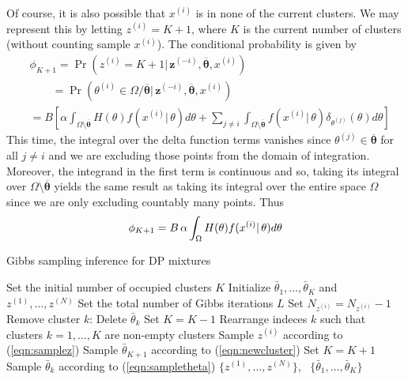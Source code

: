 \documentclass[final,3p,times,twocolumn]{elsarticle}
\DeclareMathOperator*{\Cat}{Cat}
\let\bs\boldsymbol
\begin{document}
Of course, it is also possible that $x^{(i)}$ is in none of the current clusters.
We may represent this by letting $z^{(i)} = K+1$, where $K$ is the current number of clusters (without counting sample $x^{(i)}$).
The conditional probability is given by 
\begin{equation*}
\begin{split}
&\phi_{K+1} = \Pr(z^{(i)}=K+1|\,\bs z^{(-i)},\overline {\bs \theta},x^{(i)})\\
&\quad\quad= \Pr(\theta^{(i)} \in \Omega/\bs{\overline \theta}|\,\bs z^{(-i)},\overline {\bs \theta},x^{(i)})\\
&= B\left[\alpha\int_{\Omega\setminus\overline{\bs\theta}} H(\theta)f(x^{(i)}|\,\theta)d\theta + \sum_{j\neq i}\int_{\Omega\setminus\overline{\bs\theta}}f(x^{(i)}|\,\theta)\delta_{\theta^{(j)}}(\theta)d\theta\right]
\end{split}
\end{equation*}
This time, the integral over the delta function terms vanishes since $\theta^{(j)}\in \overline{\bs\theta}$ for all $j\neq i$ and we are excluding those points from the domain of integration.
Moreover, the integrand in the first term is continuous and so, taking its integral over $\Omega\setminus\overline{\bs\theta}$ yields the same result as taking its integral over the entire space $\Omega$ since we are only excluding countably many points.
Thus
\begin{equation}
\label{eqn:phi_K+1}
\phi_{K+1} = B\, \alpha \int_\Omega H(\theta)f(x^{(i)}|\,\theta)d\theta\\
\end{equation}

\begin{algorithm}
\caption{Gibbs sampling inference for DP mixtures}
\begin{algorithmic}[1]
\State Set the initial number of occupied clusters $K$
\State Initialize $\bar \theta_1,\dots, \bar \theta_K$ and $z^{(1)},\dots,z^{(N)}$
\State Set the total number of Gibbs iterations $L$
\State Set $N_{z^{(i)}}=N_{z^{(i)}}-1$
\State Remove cluster $k$: Delete $\bar \theta_k$
\State Set $K = K - 1$
\State Rearrange indeces $k$ such that clusters 
\State \quad $k=1,\dots,K$ are non-empty clusters
\EndIf
\State Sample $z^{(i)}$ according to (\ref{eqn:samplez})%
\State Sample $\bar \theta_{K+1}$ according to (\ref{eqn:newcluster})
\State Set $K=K+1$
\EndIf
\EndFor
{}
\State Sample $\bar \theta_k$ according to (\ref{eqn:sampletheta})
\EndFor
\EndFor
\State\Return $\{z^{(1)},\dots,z^{(N)}\}$, \, $\{\bar \theta_1,\dots,\bar\theta_K\}$
\end{algorithmic}
\label{alg:gibbs2}
\end{algorithm}
\end{document}
